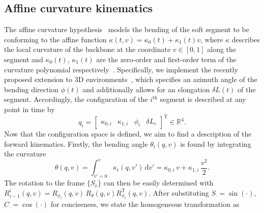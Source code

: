 \subsection{Affine curvature kinematics}\label{sub:promasens:kinematic_model_ac}
The affine curvature hypothesis~\cite{della2020soft, stella2023piecewise} models the bending of the soft segment to be conforming to the affine function $\kappa(t,v) = \kappa_0(t) + \kappa_1(t) v$, where $\kappa$ describes the local curvature of the backbone at the coordinate $v \in [0, 1]$ along the segment and $\kappa_0(t)$, $\kappa_1(t)$ are the zero-order and first-order term of the curvature polynomial respectively~\cite{della2019control}.
Specifically, we implement the recently proposed extension to 3D environments~\cite{stella2023piecewise}, which specifies an azimuth angle of the bending direction $\phi(t)$ and additionally allows for an elongation $\delta L(t)$ of the segment.
Accordingly, the configuration of the $i^\mathrm{th}$ segment is described at any point in time by
\begin{equation}
    q_i = \begin{bmatrix}\kappa_{0,i} & \kappa_{1,i} & \phi_i & \delta L_{i} \end{bmatrix}^{\mathrm{T}} \in \mathbb{R}^4.
\end{equation}
Now that the configuration space is defined, we aim to find a description of the forward kinematics. Firstly, the bending angle $\theta_i(q, v)$ is found by integrating the curvature
\begin{equation}
    \theta(q,v) = \int_{v'=0}^{v} \kappa_i(q, v') \, \mathrm{d}v' = \kappa_{0,i} \, v + \kappa_{1,i} \, \frac{v^2}{2}.
\end{equation}
The rotation to the frame $\{S_{v}\}$ can then be easily determined with $R_{i-1}^{i}(q,v) = R_{\phi_i}(q,v) \, R_{\theta}(q,v) R_{\phi_i}^\mathrm{T}(q,v)$. After substituting $S_{\cdot} = \sin(\cdot)$, $C_{\cdot} = \cos(\cdot)$ for conciseness, we state the homogeneous transformation as
